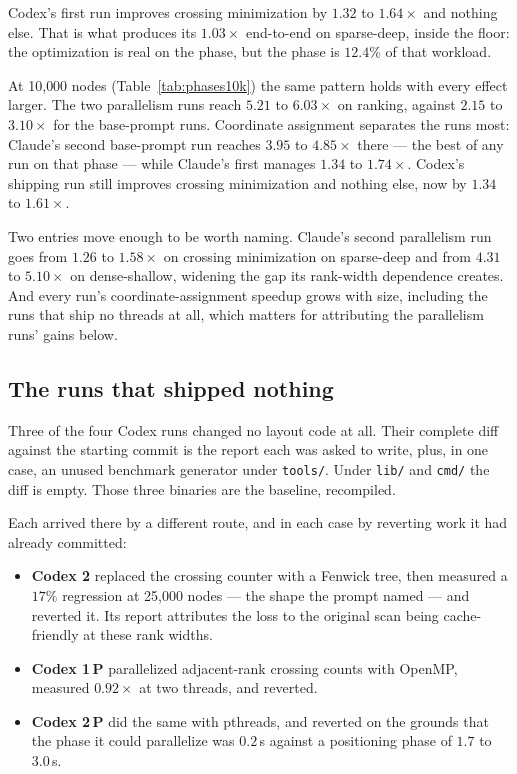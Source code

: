 Codex's first run improves crossing minimization by $1.32$ to $1.64\times$ and
nothing else. That is what produces its $1.03\times$ end-to-end on sparse-deep,
inside the floor: the optimization is real on the phase, but the phase is
$12.4\%$ of that workload.

At 10{,}000 nodes (Table~\ref{tab:phases10k}) the same pattern holds with every
effect larger. The two parallelism runs reach $5.21$ to $6.03\times$ on ranking,
against $2.15$ to $3.10\times$ for the base-prompt runs. Coordinate assignment
separates the runs most: Claude's second base-prompt run reaches $3.95$ to
$4.85\times$ there --- the best of any run on that phase --- while Claude's
first manages $1.34$ to $1.74\times$. Codex's shipping run still improves
crossing minimization and nothing else, now by $1.34$ to $1.61\times$.

Two entries move enough to be worth naming. Claude's second parallelism run goes
from $1.26$ to $1.58\times$ on crossing minimization on sparse-deep and from
$4.31$ to $5.10\times$ on dense-shallow, widening the gap its rank-width
dependence creates. And every run's coordinate-assignment speedup grows with
size, including the runs that ship no threads at all, which matters for
attributing the parallelism runs' gains below.

\subsection{The runs that shipped nothing}
\label{sec:noship}

Three of the four Codex runs changed no layout code at all. Their complete diff
against the starting commit is the report each was asked to write, plus, in one
case, an unused benchmark generator under \texttt{tools/}. Under \texttt{lib/}
and \texttt{cmd/} the diff is empty. Those three binaries are the baseline,
recompiled.

Each arrived there by a different route, and in each case by reverting work it
had already committed:

\begin{itemize}
\item \textbf{Codex 2} replaced the crossing counter with a Fenwick tree, then
      measured a $17\%$ regression at 25{,}000 nodes --- the shape the prompt
      named --- and reverted it. Its report attributes the loss to the original
      scan being cache-friendly at these rank widths.
\item \textbf{Codex 1\,P} parallelized adjacent-rank crossing counts with
      OpenMP, measured $0.92\times$ at two threads, and reverted.
\item \textbf{Codex 2\,P} did the same with pthreads, and reverted on the
      grounds that the phase it could parallelize was $0.2$\,s against a
      positioning phase of $1.7$ to $3.0$\,s.
\end{itemize}

